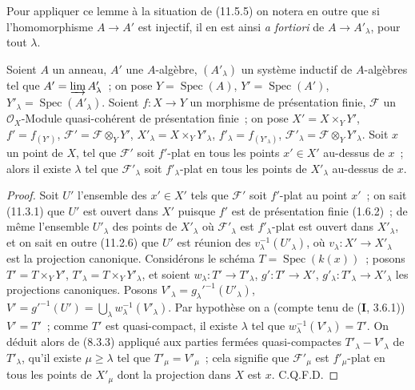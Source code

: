 
Pour appliquer ce lemme à la situation de (11.5.5) on notera en outre que si
l'homomorphisme $A\to A'$ est injectif, il en est ainsi \emph{a fortiori} de
$A\to A'_{\lambda}$, pour tout $\lambda$.

\begin{lemma}[11.5.5.2]
\label{IV.11.5.5.2-fr}
Soient $A$ un anneau, $A'$ une $A$-algèbre, $(A'_{\lambda})$ un système inductif
de $A$-algèbres tel que $A'=\varinjlim A'_{\lambda}$~; on pose
$Y=\operatorname{Spec}(A)$, $Y'=\operatorname{Spec}(A')$,
$Y'_{\lambda}=\operatorname{Spec}(A'_{\lambda})$. Soient $f:X\to Y$ un
morphisme de présentation finie, $\mathcal F$ un $\mathcal O_X$-Module
quasi-cohérent de présentation finie~; on pose $X'=X\times_Y Y'$,
$f'=f_{(Y')}$, $\mathcal F'=\mathcal F\otimes_Y Y'$,
$X'_{\lambda}=X\times_Y Y'_{\lambda}$, $f'_{\lambda}=f_{(Y'_{\lambda})}$,
$\mathcal F'_{\lambda}=\mathcal F\otimes_Y Y'_{\lambda}$. Soit $x$ un point de
$X$, tel que $\mathcal F'$ soit $f'$-plat en tous les points $x'\in X'$
au-dessus de $x$~; alors il existe $\lambda$ tel que $\mathcal F'_{\lambda}$
soit $f'_{\lambda}$-plat en tous les points de $X'_{\lambda}$ au-dessus de $x$.
\end{lemma}

\begin{proof}
Soit $U'$ l'ensemble des $x'\in X'$ tels que $\mathcal F'$ soit $f'$-plat au
point $x'$~; on sait (11.3.1) que $U'$ est ouvert dans $X'$ puisque $f'$ est de
présentation finie (1.6.2)~; de même l'ensemble $U'_{\lambda}$ des points de
$X'_{\lambda}$ où $\mathcal F'_{\lambda}$ est $f'_{\lambda}$-plat est ouvert
dans $X'_{\lambda}$, et on sait en outre (11.2.6) que $U'$ est réunion des
$v_{\lambda}^{-1}(U'_{\lambda})$, où
$v_{\lambda}:X'\to X'_{\lambda}$ est la projection canonique. Considérons le
schéma $T=\operatorname{Spec}(k(x))$~; posons $T'=T\times_Y Y'$,
$T'_{\lambda}=T\times_Y Y'_{\lambda}$, et soient
$w_{\lambda}:T'\to T'_{\lambda}$, $g':T'\to X'$,
$g'_{\lambda}:T'_{\lambda}\to X'_{\lambda}$ les projections canoniques. Posons
$V'_{\lambda}=g_{\lambda}'^{-1}(U'_{\lambda})$,
$V'=g'^{-1}(U')=\bigcup_{\lambda}w_{\lambda}^{-1}(V'_{\lambda})$. Par
hypothèse on a (compte tenu de (\textbf I, 3.6.1)) $V'=T'$~; comme $T'$ est
quasi-compact, il existe $\lambda$ tel que
$w_{\lambda}^{-1}(V'_{\lambda})=T'$. On déduit alors de (8.3.3) appliqué aux
parties fermées quasi-compactes $T'_{\lambda}-V'_{\lambda}$ de
$T'_{\lambda}$, qu'il existe $\mu\geq\lambda$ tel que
$T'_{\mu}=V'_{\mu}$~; cela signifie que $\mathcal F'_{\mu}$ est
$f'_{\mu}$-plat en tous les points de $X'_{\mu}$ dont la projection dans $X$
est $x$. C.Q.F.D.
\end{proof}

